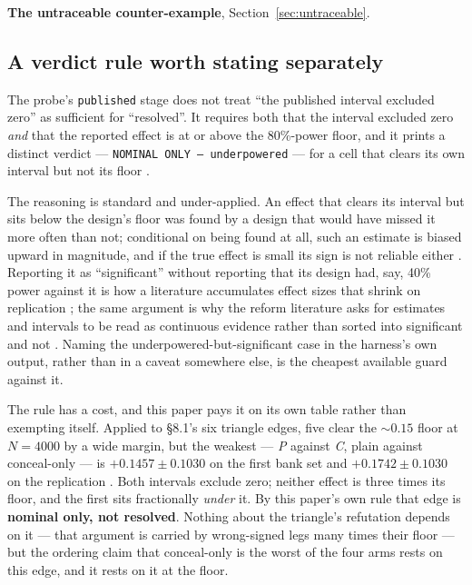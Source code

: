 \documentclass[11pt]{article}
\newcommand{\code}[1]{\texttt{#1}}
\begin{document}
\textbf{The untraceable counter-example}, Section~\ref{sec:untraceable}.

\subsection{A verdict rule worth stating separately}

The probe's \code{published} stage does not treat ``the published interval excluded zero'' as
sufficient for ``resolved''. It requires both that the interval excluded zero \emph{and} that the
reported effect is at or above the 80\%-power floor, and it prints a distinct verdict ---
\code{NOMINAL ONLY --- underpowered} --- for a cell that clears its own interval but not its floor
\cite{probefloor}.

The reasoning is standard and under-applied. An effect that clears its interval but sits below the
design's floor was found by a design that would have missed it more often than not; conditional on
being found at all, such an estimate is biased upward in magnitude, and if the true effect is small
its sign is not reliable either \cite{gelmancarlin}. Reporting it as ``significant'' without
reporting that its design had, say, 40\% power against it is how a literature accumulates effect
sizes that shrink on replication \cite{button, ioannidis}; the same argument is why the reform
literature asks for estimates and intervals to be read as continuous evidence rather than sorted
into significant and not \cite{amrhein}. Naming the underpowered-but-significant
case in the harness's own output, rather than in a caveat somewhere else, is the cheapest available
guard against it.

The rule has a cost, and this paper pays it on its own table rather than exempting itself. Applied
to \S8.1's six triangle edges, five clear the ${\sim}0.15$ floor at $N=4000$ by a wide margin, but
the weakest --- \emph{P} against \emph{C}, plain against conceal-only --- is $+0.1457 \pm 0.1030$ on
the first bank set and $+0.1742 \pm 0.1030$ on the replication \cite{concession}. Both intervals
exclude zero; neither effect is three times its floor, and the first sits fractionally
\emph{under} it. By this paper's own rule that edge is \textbf{nominal only, not resolved}. Nothing
about the triangle's refutation depends on it --- that argument is carried by wrong-signed legs many
times their floor --- but the ordering claim that conceal-only is the worst of the four arms rests on
this edge, and it rests on it at the floor.
\end{document}
